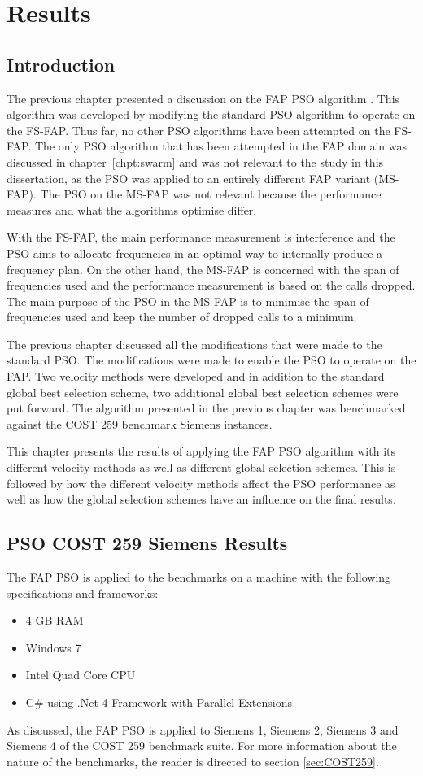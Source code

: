 \chapter{Results}
\label{chpt:results}
\section{Introduction}
The previous chapter presented a discussion on the FAP PSO algorithm . This algorithm was developed by modifying the standard PSO algorithm to operate on the FS-FAP. Thus far, no other PSO algorithms have been attempted on the FS-FAP. The only PSO algorithm that has been attempted in the FAP domain was discussed in chapter~\ref{chpt:swarm} and was not relevant to the study in this dissertation, as the PSO was applied to an entirely different FAP variant (MS-FAP). The PSO on the MS-FAP was not relevant because the performance measures and what the algorithms optimise differ.

With the FS-FAP, the main performance measurement is interference and the PSO aims to allocate frequencies in an optimal way to internally produce a frequency plan. On the other hand, the MS-FAP is concerned with the span of frequencies used and the performance measurement is based on the calls dropped. The main purpose of the PSO in the MS-FAP is to minimise the span of frequencies used and keep the number of dropped calls to a minimum.

The previous chapter discussed all the modifications that were made to the standard PSO. The modifications were made to enable the PSO to operate on the FAP. Two velocity methods were developed and in addition to the standard global best selection scheme, two additional global best selection schemes were put forward. The algorithm presented in the previous chapter was benchmarked against the COST 259 benchmark Siemens instances.

This chapter presents the results of applying the FAP PSO algorithm with its different velocity methods as well as different global selection schemes. This is followed by how the different velocity methods affect the PSO performance as well as how the global selection schemes have an influence on the final results.

\section{PSO COST 259 Siemens Results}
The FAP PSO is applied to the benchmarks on a machine with the following specifications and frameworks:
\begin{itemize}
\item 4 GB RAM
\item Windows 7
\item Intel Quad Core CPU
\item C\# using .Net 4 Framework with Parallel Extensions
\end{itemize}
As discussed, the FAP PSO is applied to Siemens 1, Siemens 2, Siemens 3 and Siemens 4 of the COST 259 benchmark suite. For more information about the nature of the benchmarks, the reader is directed to section \ref{sec:COST259}.

